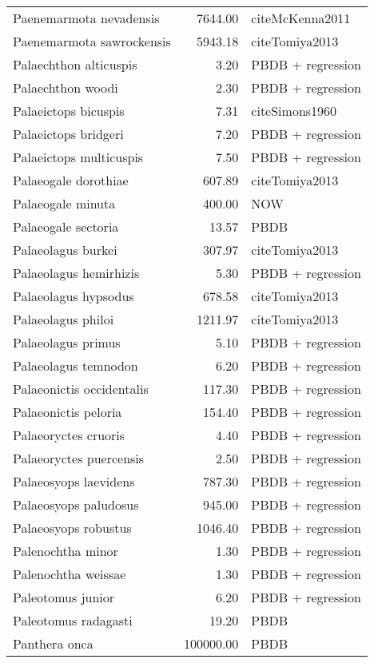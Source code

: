 \begin{table}[ht]
\begin{tabular}{lrl}
  Paenemarmota nevadensis & 7644.00 & cite{McKenna2011} \\ 
  Paenemarmota sawrockensis & 5943.18 & cite{Tomiya2013} \\ 
  Palaechthon alticuspis & 3.20 & PBDB + regression \\ 
  Palaechthon woodi & 2.30 & PBDB + regression \\ 
  Palaeictops bicuspis & 7.31 & cite{Simons1960} \\ 
  Palaeictops bridgeri & 7.20 & PBDB + regression \\ 
  Palaeictops multicuspis & 7.50 & PBDB + regression \\ 
  Palaeogale dorothiae & 607.89 & cite{Tomiya2013} \\ 
  Palaeogale minuta & 400.00 & NOW \\ 
  Palaeogale sectoria & 13.57 & PBDB \\ 
  Palaeolagus burkei & 307.97 & cite{Tomiya2013} \\ 
  Palaeolagus hemirhizis & 5.30 & PBDB + regression \\ 
  Palaeolagus hypsodus & 678.58 & cite{Tomiya2013} \\ 
  Palaeolagus philoi & 1211.97 & cite{Tomiya2013} \\ 
  Palaeolagus primus & 5.10 & PBDB + regression \\ 
  Palaeolagus temnodon & 6.20 & PBDB + regression \\ 
  Palaeonictis occidentalis & 117.30 & PBDB + regression \\ 
  Palaeonictis peloria & 154.40 & PBDB + regression \\ 
  Palaeoryctes cruoris & 4.40 & PBDB + regression \\ 
  Palaeoryctes puercensis & 2.50 & PBDB + regression \\ 
  Palaeosyops laevidens & 787.30 & PBDB + regression \\ 
  Palaeosyops paludosus & 945.00 & PBDB + regression \\ 
  Palaeosyops robustus & 1046.40 & PBDB + regression \\ 
  Palenochtha minor & 1.30 & PBDB + regression \\ 
  Palenochtha weissae & 1.30 & PBDB + regression \\ 
  Paleotomus junior & 6.20 & PBDB + regression \\ 
  Paleotomus radagasti & 19.20 & PBDB \\ 
  Panthera onca & 100000.00 & PBDB \\ 

\end{tabular}
\end{table}

